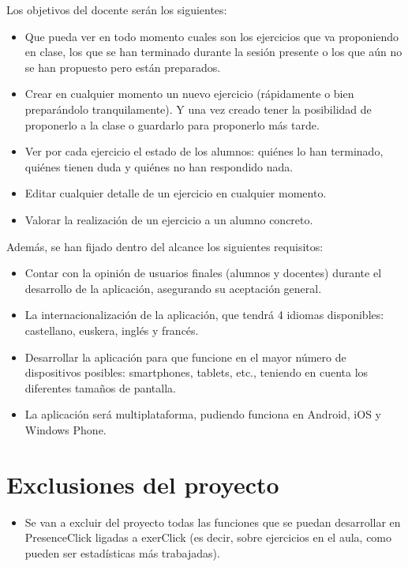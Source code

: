 Los objetivos del docente serán los siguientes:

\begin{itemize}
\item Que pueda ver en todo momento cuales son los ejercicios que va proponiendo en clase, los que se han terminado durante la sesión presente o los que aún no se han propuesto pero están preparados.
\item Crear en cualquier momento un nuevo ejercicio (rápidamente o bien preparándolo tranquilamente). Y una vez creado tener la posibilidad de proponerlo a la clase o guardarlo para proponerlo más tarde.
\item Ver por cada ejercicio el estado de los alumnos: quiénes lo han terminado, quiénes tienen duda y quiénes no han respondido nada.
\item Editar cualquier detalle de un ejercicio en cualquier momento.
\item Valorar la realización de un ejercicio a un alumno concreto.
\end{itemize}

Además, se han fijado dentro del alcance los siguientes requisitos:

\begin{itemize}
\item Contar con la opinión de usuarios finales (alumnos y docentes) durante el desarrollo de la aplicación, asegurando su aceptación general.
\item La internacionalización de la aplicación, que tendrá 4 idiomas disponibles: castellano, euskera, inglés y francés.
\item Desarrollar la aplicación para que funcione en el mayor número de dispositivos posibles: smartphones, tablets, etc., teniendo en cuenta los diferentes tamaños de pantalla.
\item La aplicación será multiplataforma, pudiendo funciona en Android, iOS y Windows Phone.
\end{itemize}



\section{Exclusiones del proyecto}

\begin{itemize}
\item Se van a excluir del proyecto todas las funciones que se puedan desarrollar en PresenceClick ligadas a exerClick (es decir, sobre ejercicios en el aula, como pueden ser estadísticas más trabajadas).
\end{itemize}


